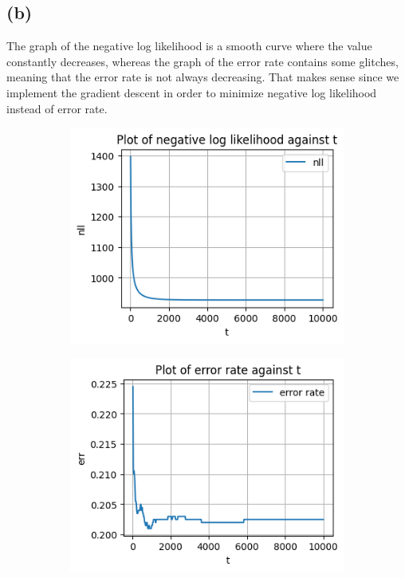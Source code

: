 \documentclass[11pt]{article}
\begin{document}
\subsection*{(b)}
The graph of the negative log likelihood is a smooth curve where the value constantly decreases, whereas the graph of the error rate contains some glitches, meaning that the error rate is not always decreasing. That makes sense since we implement the gradient descent in order to minimize negative log likelihood instead of error rate.
\begin{figure}[h]
    \centering
    \begin{subfigure}{.4\textwidth}
      \centering
      \includegraphics[width=.9\linewidth]{images/output_12_0.png}
    \end{subfigure}
    \begin{subfigure}{.4\textwidth}
      \centering
      \includegraphics[width=.9\linewidth]{images/output_13_0.png}
    \end{subfigure}
\end{figure}
\end{document}
